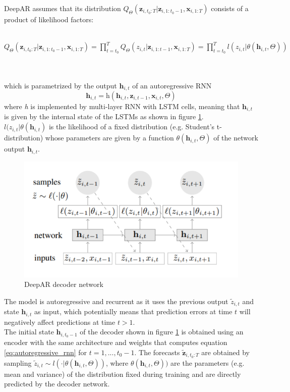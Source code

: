 \documentclass[a4paper, 12pt]{article} %
\begin{document}
	DeepAR assumes that its distribution $Q_{\Theta}(\pmb{z}_{i, t_0:T} | \pmb{z}_{i, 1:t_0-1}, \pmb{x}_{i, 1:T})$ consists of a product of likelihood factors:\\\\
	\centerline{
	$
	Q_{\Theta}(\pmb{z}_{i, t_0:T} | \pmb{z}_{i, 1:t_0-1}, \pmb{x}_{i, 1:T}) 
	= \prod_{t=t_0}^{T} Q_{\Theta}(z_{i, t} | \pmb{z}_{i, 1:t-1}, \pmb{x}_{i, 1:T})
	= \prod_{t=t_0}^{T} \textit{l}(z_{i,t} | \theta(\pmb{h}_{i,t}, \Theta))
	$
	}\\\\
	which is parametrized by the output $\pmb{h}_{i,t}$ of an autoregressive RNN
	\begin{equation} \label{eq:autoregressive_rnn}
		\pmb{h}_{i,t} = \textit{h}(\pmb{h}_{i,t}, \pmb{z}_{i, t-1}, \pmb{x}_{i, t}, \Theta )
	\end{equation}
	where \textit{h} is implemented by multi-layer RNN with LSTM cells, meaning that $\pmb{h}_{i,t}$ is given by the internal state of the LSTMs as shown in figure \ref{fig:deepar}. \\
	$\textit{l}(z_{i,t} | \theta(\pmb{h}_{i,t})$ is the likelihood of a fixed distribution (e.g. Student's t-distribution) whose parameters are given by a function $\theta(\pmb{h}_{i,t}, \Theta)$ of the network output $\pmb{h}_{i,t}$.
	\begin{figure}
		\includegraphics[width=\linewidth]{img/deepar.png}
		\caption{DeepAR decoder network}
		\label{fig:deepar}
	\end{figure}
	The model is autoregressive and recurrent as it uses the previous output $\tilde{z}_{i,t}$ and state $\pmb{h}_{i,t}$ as input, which potentially means that prediction errors at time $t$ will negatively affect predictions at time $t>1$. \\
	The initial state $\pmb{h}_{i,t_0-1}$ of the decoder shown in figure \ref{fig:deepar} is obtained using an encoder with the same architecture and weights that computes equation \ref{eq:autoregressive_rnn} for $t = 1, ..., t_0-1$. The forecasts $\tilde{\pmb{z}}_{i, t_0:T}$ are obtained by sampling $\tilde{z}_{i,t} \sim l(\cdot | \theta(\pmb{h}_{i,t}, \Theta))$, where $\theta(\pmb{h}_{i,t}, \Theta))$ are the parameters (e.g. mean and variance) of the distribution fixed during training and are directly predicted by the decoder network.
	
\end{document}
